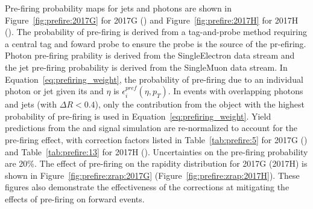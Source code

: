 Pre-firing probability maps for jets and photons are shown in Figure~\ref{fig:prefire:2017G} for 2017G (\serag) and Figure~\ref{fig:prefire:2017H} for 2017H (\serah). The probability of pre-firing is derived from a tag-and-probe method requiring a central tag and foward probe to ensure the probe is the source of the pr-efiring. Photon pre-firing prability is derived from the SingleElectron data stream and the jet pre-firing probability is derived from the SingleMuon data stream. In Equation~\ref{eq:prefiring_weight}, the probability of pre-firing due to an individual photon or jet given its \pt and $\eta$ is $\epsilon_i^{pref}(\eta,p_T)$. In events with overlapping photons and jets (with $\Delta  R < 0.4$), only the contribution from the object with the highest probability of pre-firing is used in Equation~\ref{eq:prefiring_weight}\cite{LATHOMAS}. Yield predictions from the \Wpm and \Z signal simulation are re-normalized to account for the pre-firing effect, with correction factors listed in Table~\ref{tab:prefire:5} for 2017G (\serag) and Table~\ref{tab:prefire:13} for 2017H (\serah). Uncertainties on the pre-firing probability are 20\%. The effect of pre-firing on the \zee rapidity distribution for 2017G (2017H) is shown in  Figure~\ref{fig:prefire:zrap:2017G} (Figure~\ref{fig:prefire:zrap:2017H}). These figures also demonstrate the effectiveness of the corrections at mitigating the effects of pre-firing on forward events.




%





